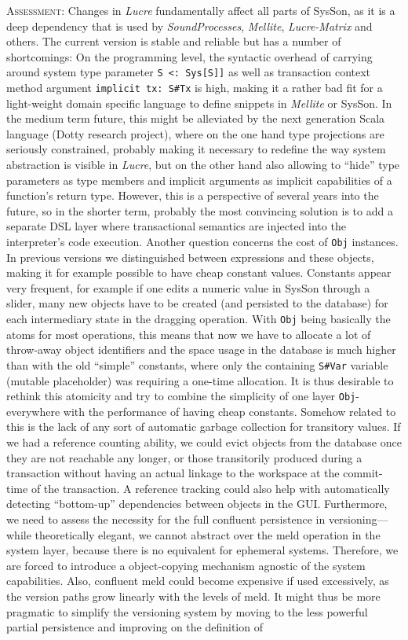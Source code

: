 \documentclass[11pt,a4paper]{article}
\newcommand{\software}[1]{\textit{#1}}
\newcommand{\sysson}[0]{SysSon}
\newcommand{\assessment}[0]{\textsc{Assessment:}}
\begin{document}
\assessment{} Changes in \software{Lucre} fundamentally affect all parts of \sysson{}, as it is a deep dependency that is used by \software{SoundProcesses}, \software{Mellite}, \software{Lucre-Matrix} and others. The current version is stable and reliable but has a number of shortcomings: On the programming level, the syntactic overhead of carrying around system type parameter \verb!S <: Sys[S]]! as well as transaction context method argument \verb!implicit tx: S#Tx! is high, making it a rather bad fit for a light-weight domain specific language to define snippets in \software{Mellite} or \sysson{}. In the medium term future, this might be alleviated by the next generation Scala language (Dotty research project), where on the one hand type projections are seriously constrained, probably making it necessary to redefine the way system abstraction is visible in \software{Lucre}, but on the other hand also allowing to ``hide'' type parameters as type members and implicit arguments as implicit capabilities of a function's return type. However, this is a perspective of several years into the future, so in the shorter term, probably the most convincing solution is to add a separate DSL layer where transactional semantics are injected into the interpreter's code execution. Another question concerns the cost of \verb!Obj! instances. In previous versions we distinguished between expressions and these objects, making it for example possible to have cheap constant values. Constants appear very frequent, for example if one edits a numeric value in \sysson{} through a slider, many new objects have to be created (and persisted to the database) for each intermediary state in the dragging operation. With \verb!Obj! being basically the atoms for most operations, this means that now we have to allocate a lot of throw-away object identifiers and the space usage in the database is much higher than with the old ``simple'' constants, where only the containing \verb!S#Var! variable (mutable placeholder) was requiring a one-time allocation. It is thus desirable to rethink this atomicity and try to combine the simplicity of one layer \verb!Obj!-everywhere with the performance of having cheap constants. Somehow related to this is the lack of any sort of automatic garbage collection for transitory values. If we had a reference counting ability, we could evict objects from the database once they are not reachable any longer, or those transitorily produced during a transaction without having an actual linkage to the workspace at the commit-time of the transaction. A reference tracking could also help with automatically detecting ``bottom-up'' dependencies between objects in the GUI. Furthermore, we need to assess the necessity for the full confluent persistence in versioning---while theoretically elegant, we cannot abstract over the meld operation in the system layer, because there is no equivalent for ephemeral systems. Therefore, we are forced to introduce a object-copying mechanism agnostic of the system capabilities. Also, confluent meld could become expensive if used excessively, as the version paths grow linearly with the levels of meld. It might thus be more pragmatic to simplify the versioning system by moving to the less powerful partial persistence and improving on the definition of 
\end{document}
